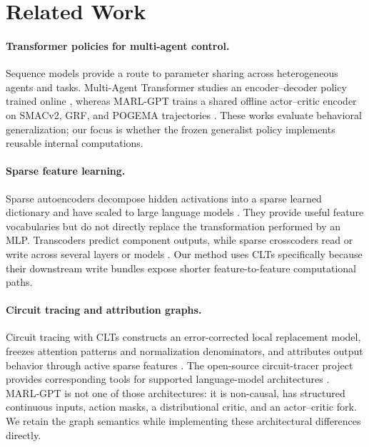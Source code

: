 \section{Related Work}

\paragraph{Transformer policies for multi-agent control.}
Sequence models provide a route to parameter sharing across heterogeneous agents and tasks. Multi-Agent Transformer studies an encoder--decoder policy trained online \cite{wen2022mat}, whereas MARL-GPT trains a shared offline actor--critic encoder on SMACv2, GRF, and POGEMA trajectories \cite{nesterova2026marlgpt}. These works evaluate behavioral generalization; our focus is whether the frozen generalist policy implements reusable internal computations.

\paragraph{Sparse feature learning.}
Sparse autoencoders decompose hidden activations into a sparse learned dictionary and have scaled to large language models \cite{bricken2023monosemanticity,templeton2024scaling}. They provide useful feature vocabularies but do not directly replace the transformation performed by an MLP. Transcoders predict component outputs, while sparse crosscoders read or write across several layers or models \cite{lindsey2024crosscoders}. Our method uses CLTs specifically because their downstream write bundles expose shorter feature-to-feature computational paths.

\paragraph{Circuit tracing and attribution graphs.}
Circuit tracing with CLTs constructs an error-corrected local replacement model, freezes attention patterns and normalization denominators, and attributes output behavior through active sparse features \cite{ameisen2025circuittracing}. The open-source circuit-tracer project provides corresponding tools for supported language-model architectures \cite{hanna2025circuittracer}. MARL-GPT is not one of those architectures: it is non-causal, has structured continuous inputs, action masks, a distributional critic, and an actor--critic fork. We retain the graph semantics while implementing these architectural differences directly.

